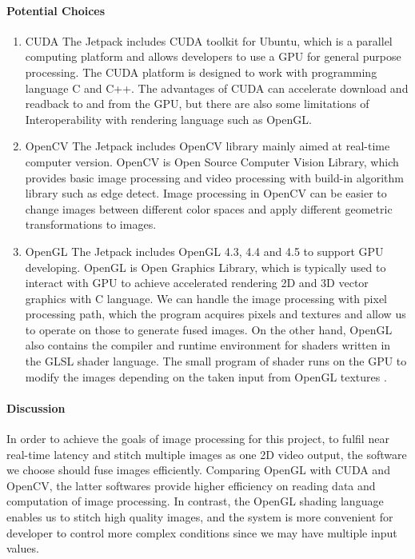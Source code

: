 \paragraph{Potential Choices}
\begin{enumerate}
\item{CUDA}
The Jetpack includes CUDA toolkit for Ubuntu, which is a parallel computing platform and 
allows developers to use a GPU for general purpose processing. The CUDA platform is designed 
to work with programming language C and C++. The advantages of CUDA can accelerate download 
and readback to and from the GPU, but there are also some limitations of Interoperability 
with rendering language such as OpenGL.\\

\item{OpenCV}
The Jetpack includes OpenCV library mainly aimed at real-time computer version. OpenCV is 
Open Source Computer Vision Library, which provides basic image processing and video 
processing with build-in algorithm library such as edge detect. Image processing in OpenCV 
can be easier to change images between different color spaces and apply different geometric 
transformations to images.\\

\item{OpenGL}
The Jetpack includes OpenGL 4.3, 4.4 and 4.5 to support GPU developing. OpenGL is Open Graphics Library, 
which is typically used to interact with GPU to achieve accelerated rendering 2D and 3D vector graphics 
with C language. We can handle the image processing with pixel processing path, which the program 
acquires pixels and textures and allow us to operate on those to generate fused images. On the other 
hand, OpenGL also contains the compiler and runtime environment for shaders written in the GLSL shader 
language. The small program of shader runs on the GPU to modify the images depending on the taken input 
from OpenGL textures \cite{shader}.\\ 
\end{enumerate}

\paragraph{Discussion}
In order to achieve the goals of image processing for this project, to fulfil near real-time latency and 
stitch multiple images as one 2D video output, the software we choose should fuse images efficiently. 
Comparing OpenGL with CUDA and OpenCV, the latter softwares provide higher efficiency on reading data and 
computation of image processing. In contrast, the OpenGL shading language enables us to stitch high 
quality images, and the system is more convenient for developer to control more complex conditions since 
we may have multiple input values.\\


